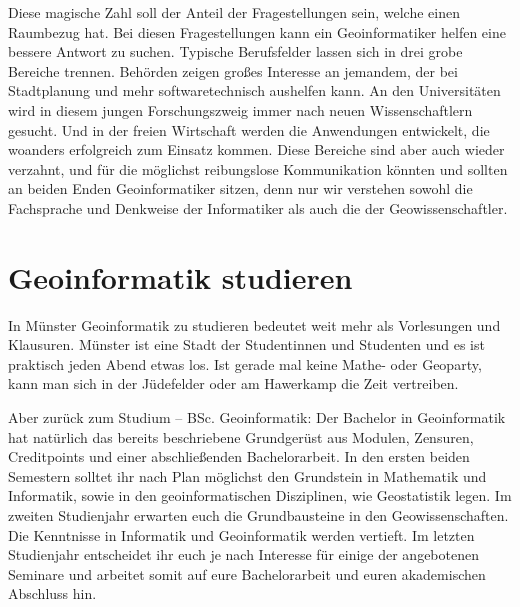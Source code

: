Diese magische Zahl soll der Anteil der Fragestellungen sein, welche einen Raumbezug hat. Bei diesen Fragestellungen kann ein Geoinformatiker helfen eine bessere Antwort zu suchen. Typische Berufsfelder lassen sich in drei grobe Bereiche trennen. Behörden zeigen großes Interesse an jemandem, der bei Stadtplanung und mehr softwaretechnisch aushelfen kann. An den Universitäten wird in diesem jungen Forschungszweig immer nach neuen Wissenschaftlern gesucht. Und in der freien Wirtschaft werden die Anwendungen entwickelt, die woanders erfolgreich zum Einsatz kommen. Diese Bereiche sind aber auch wieder verzahnt, und für die möglichst reibungslose Kommunikation könnten und sollten an beiden Enden Geoinformatiker sitzen, denn nur wir verstehen sowohl die Fachsprache und Denkweise der Informatiker als auch die der Geowissenschaftler.

\section*{Geoinformatik studieren}
In Münster Geoinformatik zu studieren bedeutet weit mehr als Vorlesungen und Klausuren. Münster ist eine Stadt der Studentinnen und Studenten und es ist praktisch jeden Abend etwas los. Ist gerade mal keine Mathe- oder Geoparty, kann man sich in der Jüdefelder oder am Hawerkamp die Zeit vertreiben.

Aber zurück zum Studium – BSc. Geoinformatik: Der Bachelor in Geoinformatik hat natürlich das bereits beschriebene Grundgerüst aus Modulen, Zensuren, Creditpoints und einer abschließenden Bachelorarbeit. In den ersten beiden Semestern solltet ihr nach Plan möglichst den Grundstein in Mathematik und Informatik, sowie in den geoinformatischen Disziplinen, wie Geostatistik legen. Im zweiten Studienjahr erwarten euch die Grundbausteine in den Geowissenschaften. Die Kenntnisse in Informatik und Geoinformatik werden vertieft. Im letzten Studienjahr entscheidet ihr euch je nach Interesse für einige der angebotenen Seminare und arbeitet somit auf eure Bachelorarbeit und euren akademischen Abschluss hin.

